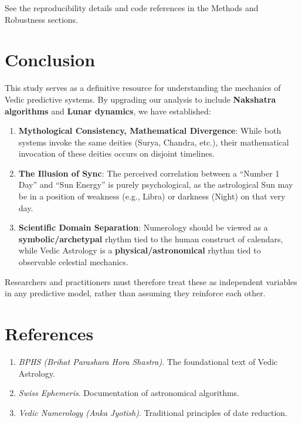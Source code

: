 \documentclass[
  11pt,
  a4paper,
  oneside,
  openany]{report}
\providecommand{\tightlist}{%
  \setlength{\itemsep}{0pt}\setlength{\parskip}{0pt}}\usepackage{longtable,booktabs,array}
\begin{document}
See the reproducibility details and code references in the Methods and
Robustness sections.

\chapter{Conclusion}\label{conclusion-1}

This study serves as a definitive resource for understanding the
mechanics of Vedic predictive systems. By upgrading our analysis to
include \textbf{Nakshatra algorithms} and \textbf{Lunar dynamics}, we
have established:

\begin{enumerate}
\def\labelenumi{\arabic{enumi}.}
\tightlist
\item
  \textbf{Mythological Consistency, Mathematical Divergence}: While both
  systems invoke the same deities (Surya, Chandra, etc.), their
  mathematical invocation of these deities occurs on disjoint timelines.
\item
  \textbf{The Illusion of Sync}: The perceived correlation between a
  ``Number 1 Day'' and ``Sun Energy'' is purely psychological, as the
  astrological Sun may be in a position of weakness (e.g., Libra) or
  darkness (Night) on that very day.
\item
  \textbf{Scientific Domain Separation}: Numerology should be viewed as
  a \textbf{symbolic/archetypal} rhythm tied to the human construct of
  calendars, while Vedic Astrology is a \textbf{physical/astronomical}
  rhythm tied to observable celestial mechanics.
\end{enumerate}

Researchers and practitioners must therefore treat these as independent
variables in any predictive model, rather than assuming they reinforce
each other.

\chapter{References}\label{references}

\begin{enumerate}
\def\labelenumi{\arabic{enumi}.}
\tightlist
\item
  \emph{BPHS (Brihat Parashara Hora Shastra)}. The foundational text of
  Vedic Astrology.
\item
  \emph{Swiss Ephemeris}. Documentation of astronomical algorithms.
\item
  \emph{Vedic Numerology (Anka Jyotish)}. Traditional principles of date
  reduction.
\end{enumerate}
\end{document}
